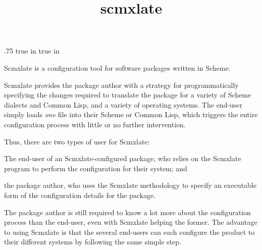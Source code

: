 



\let\TZPtexlayout 0
\let\n\noindent
\let\f\numberedfootnote

\ifx\shipout\toHTML
\let\oldsection\section
\def\section{\eject\oldsection}
\fi
\let\re\subsection

\advance\hoffset .75 true in
\advance{} true in

\title{scmxlate}


\centerline{}

\centerline{}

\medskip

Scmxlate is a configuration tool for software
packages written in Scheme.

Scmxlate provides the package author with a strategy
for programmatically specifying the changes required to
translate the package for a variety of Scheme dialects
and Common Lisp, and a variety of operating systems.
The end-user simply loads {\em one} file into
their Scheme or Common Lisp, which triggers the entire
configuration process with little or no further
intervention.

Thus, there are two types of user for Scmxlate:

\item{\bull} The end-user of an Scmxlate-configured package, who
relies on the
Scmxlate program to perform the configuration
for their system; and
\item{\bull} the package author, who uses the Scmxlate
methodology to specify an executable form of the
configuration details for the package.

The package author is still required to know a lot more
about the configuration process than the end-user, even
with Scmxlate helping the former.
The advantage to using Scmxlate is that the several
end-users can each configure the product to their
different systems by following the same simple
step.

